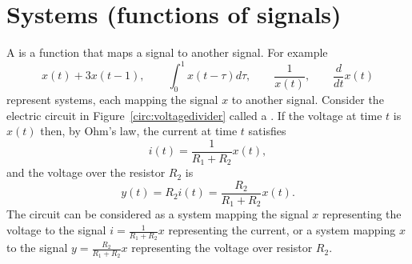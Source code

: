 





\section{Systems (functions of signals)}

A  is a function that maps a signal to another signal.  For example
\[
x(t) + 3 x(t-1), \qquad \int_{0}^{1} x(t - \tau) d\tau, \qquad \frac{1}{x(t)}, \qquad \frac{d}{dt} x(t)
\]
represent systems, each mapping the signal $x$ to another signal. Consider the electric circuit in Figure~\ref{circ:voltagedivider} called a .  If the voltage at time $t$ is $x(t)$ then, by Ohm's law, the current at time $t$ satisfies
\[
i(t) = \frac{1}{R_1 + R_2} x(t),
\]
and the voltage over the resistor $R_2$ is
\begin{equation}\label{eq:voltagedivider}
y(t) = R_2 i(t) = \frac{R_2}{R_1 + R_2} x(t).
\end{equation}
The circuit can be considered as a system mapping the signal $x$ representing the voltage to the signal $i = \tfrac{1}{R_1+R_2}x$ representing the current, or a system mapping $x$ to the signal $y=\frac{R_2}{R_1 + R_2}x$ representing the voltage over resistor $R_2$.

